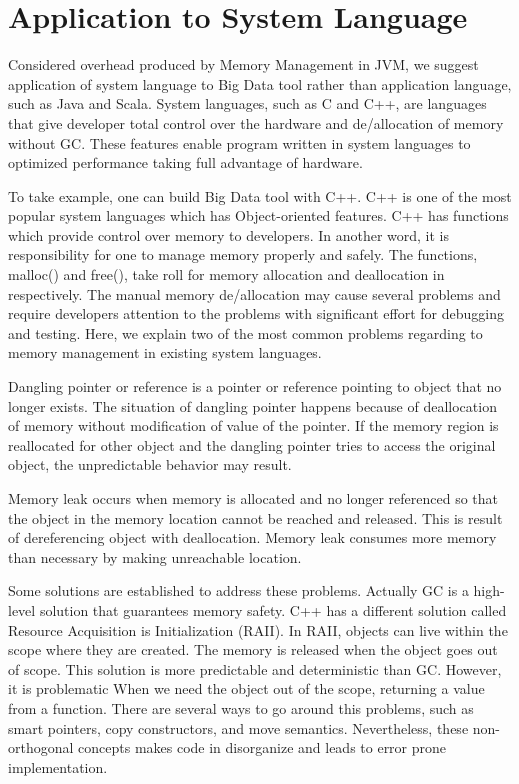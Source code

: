 \section{Application to System Language}
\label{sec:history}
Considered overhead produced by Memory Management in JVM, we suggest application of system language to Big Data tool rather than application language, such as Java and Scala. 
System languages, such as C and C++, are languages that give developer total control over the hardware and de/allocation of memory without GC. 
These features enable program written in system languages to optimized performance taking full advantage of hardware. 

To take example, one can build Big Data tool with C++. C++ is one of the most popular system languages which has Object-oriented features. 
C++ has functions which provide control over memory to developers. In another word, it is responsibility for one to manage memory properly and safely. 
The functions, malloc() and free(), take roll for memory allocation and deallocation in respectively. The manual memory de/allocation may cause several problems and require developers 
attention to the problems with significant effort for debugging and testing. Here, we explain two of the most common problems regarding to memory management in existing system languages.

Dangling pointer or reference is a pointer or reference pointing to object that no longer exists. The situation of dangling pointer happens 
because of deallocation of memory without modification of value of the pointer. 
If the memory region is reallocated for other object and the dangling pointer tries to access the original object, the unpredictable behavior may result. 

Memory leak occurs when memory is allocated and no longer referenced so that the object in the memory location cannot be reached and released.
This is result of dereferencing object with deallocation. Memory leak consumes more memory than necessary by making unreachable location.

Some solutions are established to address these problems. Actually GC is a high-level solution that guarantees memory safety. 
C++ has a different solution called Resource Acquisition is Initialization (RAII). In RAII, objects can live within the scope where they are created. 
The memory is released when the object goes out of scope. This solution is more predictable and deterministic than GC. 
However, it is problematic When we need the object out of the scope, returning a value from a function. 
There are several ways to go around this problems, such as smart pointers, copy constructors, and move semantics. 
Nevertheless, these non-orthogonal concepts makes code in disorganize and leads to error prone implementation. 

